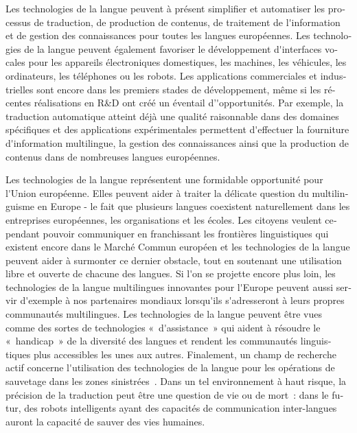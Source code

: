 \begin{french}
\begin{multicols}{2}
Les technologies de la langue peuvent à présent simplifier et
automatiser les processus de traduction, de production de contenus, de
traitement de l{\mbox '}information et de gestion des connaissances
pour toutes les langues européennes. Les technologies de la langue
peuvent également favoriser le développement d{\mbox '}interfaces
vocales pour les appareils électroniques domestiques, les machines,
les véhicules, les ordinateurs, les téléphones ou les robots. Les applications
commerciales et industrielles sont encore dans les premiers stades de
développement, même si les récentes réalisations en R\&D ont créé un
éventail d'{\mbox '}opportunités. Par exemple, la traduction
automatique atteint déjà une qualité raisonnable dans des domaines
spécifiques et des applications expérimentales permettent d{\mbox
 '}effectuer la fourniture d{\mbox '}information multilingue, la
gestion des connaissances ainsi que la production de contenus dans de
nombreuses langues européennes.


Les technologies de la langue représentent une formidable opportunité
pour l{\mbox '}Union européenne. Elles peuvent aider à traiter la
délicate question du multilinguisme en Europe - le fait que plusieurs
langues coexistent naturellement dans les entreprises européennes, les
organisations et les écoles. Les citoyens veulent cependant pouvoir
communiquer en franchissant les frontières linguistiques qui existent
encore dans le Marché Commun européen et les technologies de la langue
peuvent aider à surmonter ce dernier obstacle, tout en soutenant une
utilisation libre et ouverte de chacune des langues. Si l{\mbox '}on
se projette encore plus loin, les technologies de la langue
multilingues innovantes pour l{\mbox '}Europe peuvent aussi servir
d{\mbox '}exemple à nos partenaires mondiaux lorsqu{\mbox '}ils
s{\mbox '}adresseront à leurs propres communautés multilingues. Les
technologies de la langue peuvent être vues comme des sortes de
technologies «~d{\mbox '}assistance~» qui aident à résoudre le
«~handicap~» de la diversité des langues et rendent les communautés
linguistiques plus accessibles les unes aux autres. Finalement, un
champ de recherche actif concerne l{\mbox '}utilisation des
technologies de la langue pour les opérations de sauvetage dans les
zones sinistrées~\cite{resnick2011}. Dans un tel environnement à haut
risque, la précision de la traduction peut être une question de vie ou
de mort~: dans le futur, des robots intelligents ayant des capacités
de communication inter-langues auront la capacité de sauver des vies
humaines.


\end{multicols}
\end{french}
